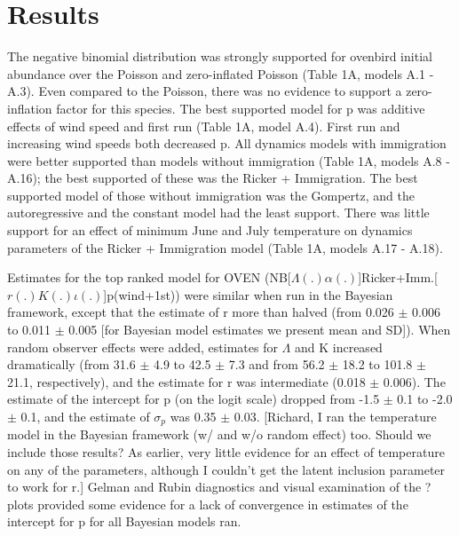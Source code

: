 \documentclass[12pt]{article}
\begin{document}
\section{Results}

The negative binomial distribution was strongly supported for ovenbird
initial abundance over the Poisson and zero-inflated Poisson (Table
1A, models A.1 - A.3).  Even compared to the Poisson, there was no
evidence to support a zero-inflation factor for this species.  The
best supported model for p was additive effects of wind speed and
first run (Table 1A, model A.4).  First run and increasing wind speeds
both decreased p.  All dynamics models with immigration were better
supported than models without immigration (Table 1A, models A.8 -
A.16); the best supported of these was the Ricker + Immigration.  The
best supported model of those without immigration was the Gompertz,
and the autoregressive and the constant model had the least support.
There was little support for an effect of minimum June and July
temperature on dynamics parameters of the Ricker + Immigration model
(Table 1A, models A.17 - A.18).

Estimates for the top ranked model for OVEN
(NB[$\Lambda (.) \alpha (.)$]Ricker+Imm.[$r(.)K(.) \iota (.)$]p(wind+1st)) were similar when
run in the Bayesian framework, except that the estimate of r more than
halved (from 0.026 $\pm$ 0.006 to 0.011 $\pm$ 0.005 [for Bayesian model
estimates we present mean and SD]).  When random observer effects were
added, estimates for $\Lambda$ and K increased dramatically (from 31.6 $\pm$ 4.9
to 42.5 $\pm$ 7.3 and from 56.2 $\pm$ 18.2 to 101.8 $\pm$ 21.1, respectively), and
the estimate for r was intermediate (0.018 $\pm$ 0.006).  The estimate of
the intercept for p (on the logit scale) dropped from -1.5 $\pm$ 0.1 to
-2.0 $\pm$ 0.1, and the estimate of $\sigma_p$ was 0.35 $\pm$ 0.03.  [Richard, I ran
the temperature model in the Bayesian framework (w/ and w/o random
effect) too.  Should we include those results?  As earlier, very
little evidence for an effect of temperature on any of the parameters,
although I couldn't get the latent inclusion parameter to work for r.]
Gelman and Rubin diagnostics and visual examination of the ? plots
provided some evidence for a lack of convergence in estimates of the
intercept for p for all Bayesian models ran.
\end{document}
